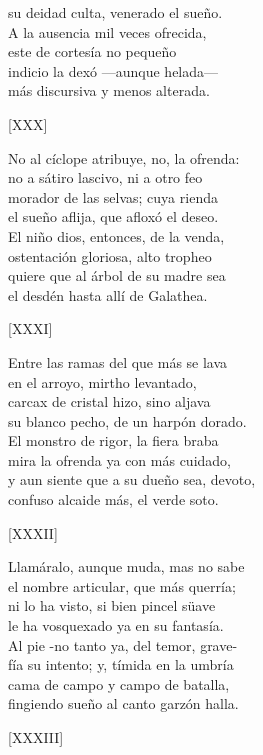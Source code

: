\documentclass[11pt,a4paper,twoside]{article}
\begin{document}
su deidad culta, venerado el sueño.\\
A la ausencia mil veces ofrecida,\\
este de cortesía no pequeño\\
indicio la dexó —aunque  helada—\\
más discursiva y menos alterada.\pend
\begin{center}
	[XXX]
\end{center}\pstart
No al cíclope atribuye, no, la ofrenda:\\
no a sátiro lascivo, ni a otro feo\\
morador de las selvas; cuya rienda\\
el sueño aflija, que afloxó el deseo.\\
El niño dios, entonces, de la venda,\\
ostentación gloriosa, alto tropheo\\
quiere que al árbol de su madre sea\\
el desdén hasta allí de Galathea.\pend
\begin{center}
	[XXXI]
\end{center}\pstart
Entre las ramas del que más se lava\\
en el arroyo, mirtho levantado,\\
carcax de cristal hizo, sino aljava\\
su blanco pecho, de un harpón dorado.\\
El monstro de rigor, la fiera braba\\
mira la ofrenda ya con más cuidado,\\
y aun siente que a su dueño sea, devoto,\\
confuso alcaide más, el verde soto.\pend
\begin{center}
	[XXXII]
\end{center}\pstart
Llamáralo, aunque muda, mas no sabe\\
el nombre articular, que más querría;\\
ni lo ha visto, si bien pincel süave\\
le ha vosquexado ya en su fantasía.\\
Al pie -no tanto ya, del temor, grave-\\
fía su intento; y, tímida en la umbría\\
cama de campo y campo de batalla,\\
fingiendo sueño al canto garzón halla.\pend
\begin{center}
	[XXXIII]
\end{center}\pstart
\end{document}
